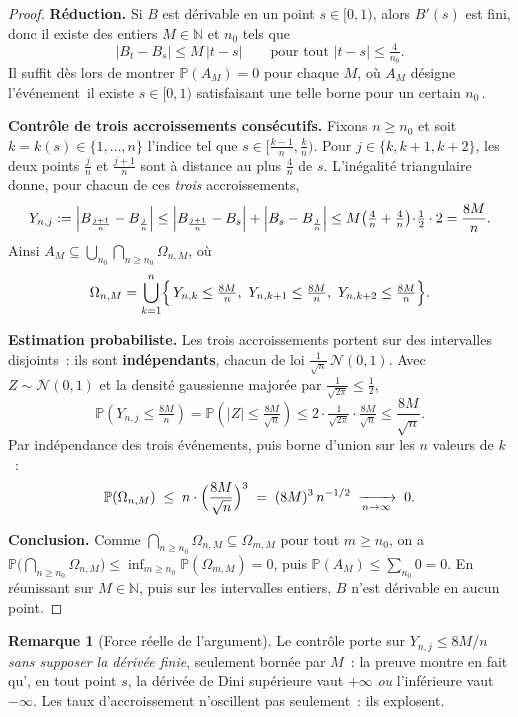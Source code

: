 \documentclass[11pt,a4paper]{article}
\providecommand{\og}{\guillemotleft\,}
\providecommand{\fg}{\,\guillemotright}
\theoremstyle{plain}
\theoremstyle{definition}
\newtheorem{remarque}[theoreme]{Remarque}
\newcommand{\Prob}{\mathbb{P}}
\newcommand{\N}{\mathbb{N}}
\newcommand{\Loi}{\mathcal{N}}
\newcommand{\abs}[1]{\left\lvert #1 \right\rvert}
\newcommand{\ps}{\text{p.s.}}
\begin{document}
\begin{proof}
\textbf{R\'eduction.} Si $B$ est d\'erivable en un point $s\in[0,1)$, alors $B'(s)$ est fini, donc il existe des entiers $M\in\N$ et $n_0$ tels que
\[
\abs{B_t-B_s}\le M\,\abs{t-s}\qquad\text{pour tout }\abs{t-s}\le \tfrac{4}{n_0}.
\]
Il suffit d\`es lors de montrer $\Prob(A_M)=0$ pour chaque $M$, o\`u $A_M$ d\'esigne l'\'ev\'enement \og il existe $s\in[0,1)$ satisfaisant une telle borne pour un certain $n_0$\fg.

\textbf{Contr\^ole de trois accroissements cons\'ecutifs.} Fixons $n\ge n_0$ et soit $k=k(s)\in\{1,\dots,n\}$ l'indice tel que $s\in\bigl[\tfrac{k-1}{n},\tfrac{k}{n}\bigr)$. Pour $j\in\{k,k+1,k+2\}$, les deux points $\tfrac{j}{n}$ et $\tfrac{j+1}{n}$ sont \`a distance au plus $\tfrac{4}{n}$ de $s$. L'in\'egalit\'e triangulaire donne, pour chacun de ces \emph{trois} accroissements,
\[
Y_{n,j}:=\Bigl\lvert B_{\frac{j+1}{n}}-B_{\frac{j}{n}}\Bigr\rvert
\le \Bigl\lvert B_{\frac{j+1}{n}}-B_s\Bigr\rvert+\Bigl\lvert B_s-B_{\frac{j}{n}}\Bigr\rvert
\le M\!\left(\tfrac{4}{n}+\tfrac{4}{n}\right)\!\cdot\!\tfrac12\cdot 2=\frac{8M}{n}.
\]
Ainsi $A_M\subseteq\bigcup_{n_0}\bigcap_{n\ge n_0}\Omega_{n,M}$, o\`u
\[
\Omega_{n,M}=\bigcup_{k=1}^{n}\Bigl\{\,Y_{n,k}\le\tfrac{8M}{n},\ Y_{n,k+1}\le\tfrac{8M}{n},\ Y_{n,k+2}\le\tfrac{8M}{n}\Bigr\}.
\]

\textbf{Estimation probabiliste.} Les trois accroissements portent sur des intervalles disjoints~: ils sont \textbf{ind\'ependants}, chacun de loi $\tfrac{1}{\sqrt n}\,\Loi(0,1)$. Avec $Z\sim\Loi(0,1)$ et la densit\'e gaussienne major\'ee par $\tfrac{1}{\sqrt{2\pi}}\le\tfrac12$,
\[
\Prob\!\left(Y_{n,j}\le\tfrac{8M}{n}\right)
=\Prob\!\left(\abs{Z}\le\tfrac{8M}{\sqrt n}\right)
\le 2\cdot\tfrac{1}{\sqrt{2\pi}}\cdot\tfrac{8M}{\sqrt n}
\le \frac{8M}{\sqrt n}.
\]
Par ind\'ependance des trois \'ev\'enements, puis borne d'union sur les $n$ valeurs de $k$~:
\[
\Prob(\Omega_{n,M})\;\le\; n\cdot\Bigl(\frac{8M}{\sqrt n}\Bigr)^{3}
\;=\;(8M)^3\,n^{-1/2}\;\xrightarrow[n\to\infty]{}\;0.
\]

\textbf{Conclusion.} Comme $\bigcap_{n\ge n_0}\Omega_{n,M}\subseteq\Omega_{m,M}$ pour tout $m\ge n_0$, on a
$\Prob\bigl(\bigcap_{n\ge n_0}\Omega_{n,M}\bigr)\le\inf_{m\ge n_0}\Prob(\Omega_{m,M})=0$,
puis $\Prob(A_M)\le\sum_{n_0}0=0$. En r\'eunissant sur $M\in\N$, puis sur les intervalles entiers, $B$ n'est \ps{} d\'erivable en aucun point.
\end{proof}

\begin{remarque}[Force r\'eelle de l'argument]
Le contr\^ole porte sur $Y_{n,j}\le 8M/n$ \emph{sans supposer la d\'eriv\'ee finie}, seulement born\'ee par $M$~: la preuve montre en fait qu'\ps, en tout point $s$, la d\'eriv\'ee de Dini sup\'erieure vaut $+\infty$ \emph{ou} l'inf\'erieure vaut $-\infty$. Les taux d'accroissement n'oscillent pas seulement~: ils explosent.
\end{remarque}
\end{document}
